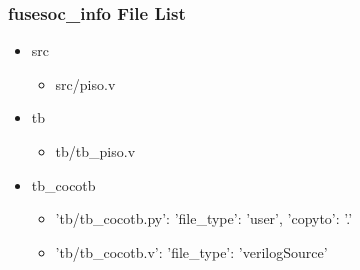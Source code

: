 \subsubsection{fusesoc\_info File List}
\begin{itemize}
\item src
	\begin{itemize}
	\item src/piso.v
	\end{itemize}
\item tb
	\begin{itemize}
	\item tb/tb\_piso.v
	\end{itemize}
\item tb\_cocotb
	\begin{itemize}
	\item {'tb/tb\_cocotb.py': {'file\_type': 'user', 'copyto': '.'}}
	\item {'tb/tb\_cocotb.v': {'file\_type': 'verilogSource'}}
	\end{itemize}
\end{itemize}
